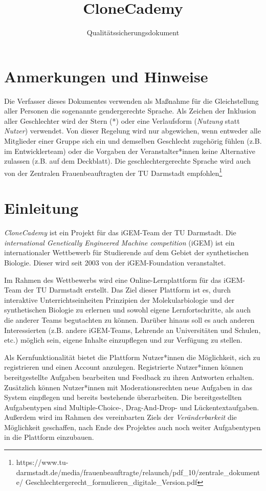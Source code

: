 \documentclass[accentcolor=tud0b,12pt,paper=a4]{tudreport}
\title{CloneCademy}
\subtitle{Qualitätssicherungsdokument}
\begin{document}
\maketitle
\tableofcontents

\chapter*{Anmerkungen und Hinweise}
Die Verfasser dieses Dokumentes verwenden als Maßnahme für die Gleichstellung aller Personen die sogenannte gendergerechte Sprache. Als Zeichen der Inklusion aller Geschlechter wird der Stern (*) oder eine Verlaufsform (\emph{Nutzung} statt \emph{Nutzer}) verwendet. Von dieser Regelung wird nur abgewichen, wenn entweder alle Mitglieder einer Gruppe sich ein und demselben Geschlecht zugehörig fühlen (z.B. im Entwicklerteam) oder die Vorgaben der Veranstalter*innen keine Alternative zulassen (z.B. auf dem Deckblatt). Die geschlechtergerechte Sprache wird auch von der Zentralen Frauenbeauftragten der TU Darmstadt empfohlen\footnote{https://www.tu-darmstadt.de/media/frauenbeauftragte/relaunch/pdf\_10/zentrale\_dokumente/ Geschlechtergerecht\_formulieren\_digitale\_Version.pdf}

\chapter{Einleitung}

\emph{CloneCademy} ist ein Projekt für das iGEM-Team der TU Darmstadt. Die \emph{international Genetically Engineered Machine competition} (iGEM) ist ein internationaler Wettbewerb für Studierende auf dem Gebiet der synthetischen Biologie.
Dieser wird seit 2003 von der iGEM-Foundation veranstaltet.

Im Rahmen des Wettbewerbs wird eine Online-Lernplattform für das iGEM-Team der TU Darmstadt erstellt. Das Ziel dieser Plattform ist es, durch interaktive Unterrichtseinheiten Prinzipien der Molekularbiologie und der synthetischen Biologie zu erlernen und sowohl eigene Lernfortschritte, als auch die anderer Teams begutachten zu können. Darüber hinaus soll es auch anderen Interessierten (z.B. andere iGEM-Teams, Lehrende an Universitäten und Schulen, etc.) möglich sein, eigene Inhalte einzupflegen und zur Verfügung zu stellen.

Als Kernfunktionalität bietet die Plattform Nutzer*innen die Möglichkeit, sich zu registrieren und einen Account anzulegen. Registrierte Nutzer*innen können bereitgestellte Aufgaben bearbeiten und Feedback zu ihren Antworten erhalten. Zusätzlich können Nutzer*innen mit Moderationsrechten neue Aufgaben in das System einpflegen und bereits bestehende überarbeiten. Die bereitgestellten Aufgabentypen sind Multiple-Choice-, Drag-And-Drop- und Lückentextaufgaben. Außerdem wird im Rahmen des vereinbarten Ziels der \emph{Veränderbarkeit} die Möglichkeit geschaffen, nach Ende des Projektes auch noch weiter Aufgabentypen in die Plattform einzubauen.
\end{document}
